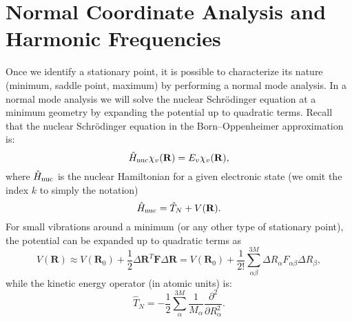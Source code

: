 \documentclass[../Main/chem532-notes.tex]{subfiles}
\begin{document}
\section{Normal Coordinate Analysis and Harmonic Frequencies}
Once we identify a stationary point, it is possible to characterize its nature (minimum, saddle point, maximum) by performing a normal mode analysis.
In a normal mode analysis we will solve the nuclear Schr\"{o}dinger equation at a minimum geometry by expanding the potential up to quadratic terms.
Recall that the nuclear Schr\"{o}dinger equation in the Born--Oppenheimer approximation is:
\begin{equation}
\hat{H}_{{\rm nuc}} \chi_{v}(\mathbf{R}) =  E_{v} \chi_{v}(\mathbf{R}),
\end{equation}
where $\hat{H}_{{\rm nuc}}$ is the nuclear Hamiltonian for a given electronic state (we omit the index $k$ to simply the notation)
\begin{equation}
\hat{H}_{{\rm nuc}} = \hat{T}_{N} + V(\mathbf{R}).
\end{equation}
For small vibrations around a minimum (or any other type of stationary point), the potential can be expanded up to quadratic terms as
\begin{equation}
V(\mathbf{R}) \approx V(\mathbf{R}_0)
+ \frac{1}{2} \Delta\mathbf{\mathbf{R}}^{T} \mathbf{F} \Delta \mathbf{R}
= V(\mathbf{R}_0) + 
\frac{1}{2!} \sum_{\alpha\beta}^{3M}  \Delta R_\alpha F_{\alpha\beta} \Delta R_\beta,
\end{equation}
while the kinetic energy operator (in atomic units) is:
\begin{equation}
\hat{T}_N = -\frac{1}{2} \sum_\alpha^{3M} \frac{1}{M_\alpha} \frac{\partial^2}{\partial R_\alpha^2}.
\end{equation}
\end{document}
